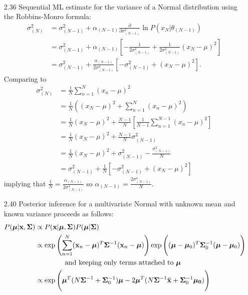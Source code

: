 \documentclass[]{article}
\begin{document}
\begin{enumerate}
\begin{align*}
	\end{align*}
	\item[2.36] Sequential ML estimate for the variance of a Normal distribution using the Robbins-Monro formula:
	\begin{align*}
	\sigma^2_{(N)} &= \sigma^2_{(N-1)} + \alpha_{(N-1)}\frac{\partial}{\partial \sigma^2_{(N-1)}} \ln P(x_N | \theta_{(N-1)}) \\
	&= \sigma^2_{(N-1)} + \alpha_{(N-1)}\left[ -\frac{1}{2 \sigma^2_{(N-1)}} + \frac{1}{2 \sigma^2_{(N-1)}} (x_N - \mu)^2 \right] \\
	&= \sigma^2_{(N-1)} + \frac{\alpha_{(N-1)}}{2 \sigma_{(N-1)}^4} \left[ -\sigma_{(N-1)}^2 + (x_N - \mu)^2 \right].
	\end{align*}
	Comparing to
	\begin{align*}
	\sigma_{(N)}^2 &= \frac{1}{N}\sum_{n=1}^{N}(x_n - \mu)^2 \\
	&= \frac{1}{N}\left( (x_N - \mu)^2 + \sum_{n=1}^{N} (x_n - \mu)^2 \right) \\
	&= \frac{1}{N}(x_N - \mu)^2 + \frac{N-1}{N}\left[ \frac{1}{N-1}\sum_{n=1}^{N-1}(x_n - \mu)^2 \right] \\
	&= \frac{1}{N}(x_N - \mu)^2 + \frac{N-1}{N} \sigma_{(N-1)}^2 \\
	&= \frac{1}{N}(x_N - \mu)^2 + \sigma_{(N-1)}^2 - \frac{\sigma_{(N-1)}^2}{N} \\
	&= \sigma_{(N-1)}^2 + \frac{1}{N}\left[ -\sigma_{(N-1)}^2 + (x_N - \mu)^2 \right]
	\end{align*}
	implying that $\frac{1}{N} = \frac{\alpha_{(N-1)}}{2 \sigma_{(N-1)}^4}$ so $\alpha_{(N-1)} = \frac{2 \sigma_{(N-1)}^4}{N}$.	\item[2.40] Posterior inference for a multivariate Normal with unknown mean and known variance proceeds as follows:
	\begin{align*}
	P(\bm{\mu}|\mathbf{x}, \bm{\Sigma}) &\propto P(\mathbf{x}|\bm{\mu}, \bm{\Sigma}) P(\bm{\mu}|\bm{\Sigma}) \\
	&\propto \exp \left( \sum_{n=1}^{N} (\mathbf{x}_n - \bm{\mu})^T\bm{\Sigma}^{-1}(\mathbf{x}_n - \bm{\mu}) \right) \exp \Bigg( (\bm{\mu} - \bm{\mu}_0)^T\bm{\Sigma}_0^{-1}(\bm{\mu} - \bm{\mu}_0) \Bigg) \\
	& \hspace{1.5cm} \text{and keeping only terms attached to $\bm{\mu}$} \\
	& \propto \exp \Bigg( \bm{\mu}^T(N\bm{\Sigma}^{-1} + \bm{\Sigma}^{-1}_0)\bm{\mu} - 2\bm{\mu}^T(N\bm{\Sigma}^{-1}\mathbf{\bar{x}} + \bm{\Sigma}^{-1}_0 \bm{\mu_0}) \Bigg) \\

\end{align*}
\end{enumerate}
\end{document}
